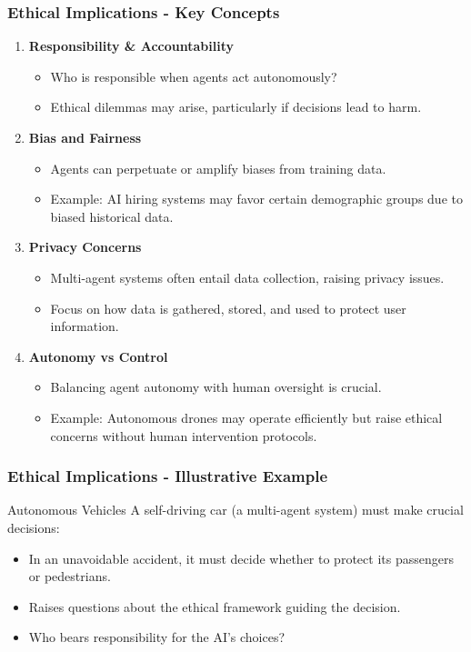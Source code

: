 \documentclass[aspectratio=169]{beamer}
\begin{document}
\begin{frame}[fragile]
    \frametitle{Ethical Implications - Key Concepts}
    \begin{enumerate}
        \item \textbf{Responsibility \& Accountability}
        \begin{itemize}
            \item Who is responsible when agents act autonomously?
            \item Ethical dilemmas may arise, particularly if decisions lead to harm.
        \end{itemize}
        
        \item \textbf{Bias and Fairness}
        \begin{itemize}
            \item Agents can perpetuate or amplify biases from training data.
            \item Example: AI hiring systems may favor certain demographic groups due to biased historical data.
        \end{itemize}
        
        \item \textbf{Privacy Concerns}
        \begin{itemize}
            \item Multi-agent systems often entail data collection, raising privacy issues.
            \item Focus on how data is gathered, stored, and used to protect user information.
        \end{itemize}

        \item \textbf{Autonomy vs Control}
        \begin{itemize}
            \item Balancing agent autonomy with human oversight is crucial.
            \item Example: Autonomous drones may operate efficiently but raise ethical concerns without human intervention protocols.
        \end{itemize}
    \end{enumerate}
\end{frame}

\begin{frame}[fragile]
    \frametitle{Ethical Implications - Illustrative Example}
    \begin{block}{Autonomous Vehicles}
        A self-driving car (a multi-agent system) must make crucial decisions:
        \begin{itemize}
            \item In an unavoidable accident, it must decide whether to protect its passengers or pedestrians.
            \item Raises questions about the ethical framework guiding the decision.
            \item Who bears responsibility for the AI's choices?
        \end{itemize}
    \end{block}
\end{frame}
\end{document}

